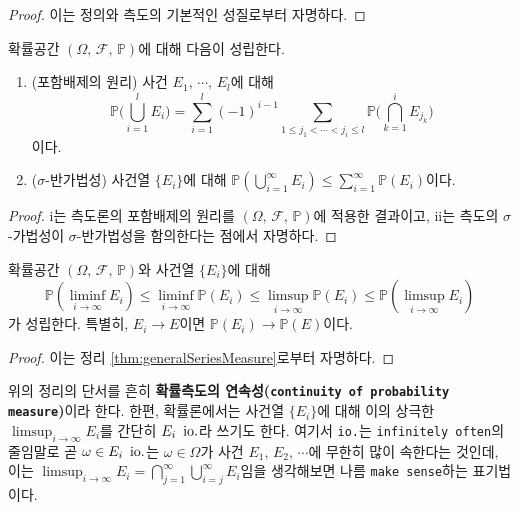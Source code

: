\begin{proof}
    이는 정의와 측도의 기본적인 성질로부터 자명하다.
\end{proof}

\begin{theorem}
    확률공간 $(\Omega,\,\mathcal{F},\,\mathbb{P})$에 대해 다음이 성립한다.
    \begin{enumerate}
        \item (포함배제의 원리) 사건 $E_1,\,\cdots,\,E_l$에 대해
        \begin{equation*}
            \mathbb{P}\bigg(\bigcup_{i=1}^lE_i\bigg)=\sum_{i=1}^l(-1)^{i-1}\sum_{1\leq j_1<\cdots<j_i\leq l}\mathbb{P}\bigg(\bigcap_{k=1}^i E_{j_k}\bigg)
        \end{equation*}
        이다.
        \item ($\sigma$-반가법성) 사건열 $\{E_i\}$에 대해 $\mathbb{P}(\bigcup_{i=1}^\infty E_i)\leq\sum_{i=1}^\infty\mathbb{P}(E_i)$이다.
    \end{enumerate}
\end{theorem}

\begin{proof}
    i는 측도론의 포함배제의 원리를 $(\Omega,\,\mathcal{F},\,\mathbb{P})$에 적용한 결과이고, ii는 측도의 $\sigma$-가법성이 $\sigma$-반가법성을 함의한다는 점에서 자명하다.
\end{proof}

\begin{theorem}
    확률공간 $(\Omega,\,\mathcal{F},\,\mathbb{P})$와 사건열 $\{E_i\}$에 대해 
    \begin{equation*}
        \mathbb{P}(\liminf_{i\to\infty}E_i)\leq\liminf_{i\to\infty}\mathbb{P}(E_i)\leq\limsup_{i\to\infty}\mathbb{P}(E_i)\leq\mathbb{P}(\limsup_{i\to\infty}E_i)
    \end{equation*}
    가 성립한다. 특별히, $E_i\to E$이면 $\mathbb{P}(E_i)\to\mathbb{P}(E)$이다.
\end{theorem}

\begin{proof}
    이는 정리 \ref{thm:generalSeriesMeasure}로부터 자명하다.
\end{proof}

위의 정리의 단서를 흔히 \textbf{확률측도의 연속성(\texttt{continuity of probability measure})}이라 한다. 한편, 확률론에서는 사건열 $\{E_i\}$에 대해 이의 상극한 $\limsup_{i\to\infty}E_i$를 간단히 $E_i\,\,\,\mathrm{io.}$라 쓰기도 한다. 여기서 \texttt{io.}는 \texttt{infinitely often}의 줄임말로 곧 $\omega\in E_i\,\,\,\mathrm{io.}$는 $\omega\in\Omega$가 사건 $E_1,\,E_2,\,\cdots$에 무한히 많이 속한다는 것인데, 이는 $\limsup_{i\to\infty}E_i=\bigcap_{j=1}^\infty\bigcup_{i=j}^\infty E_i$임을 생각해보면 나름 \texttt{make sense}하는 표기법이다.

